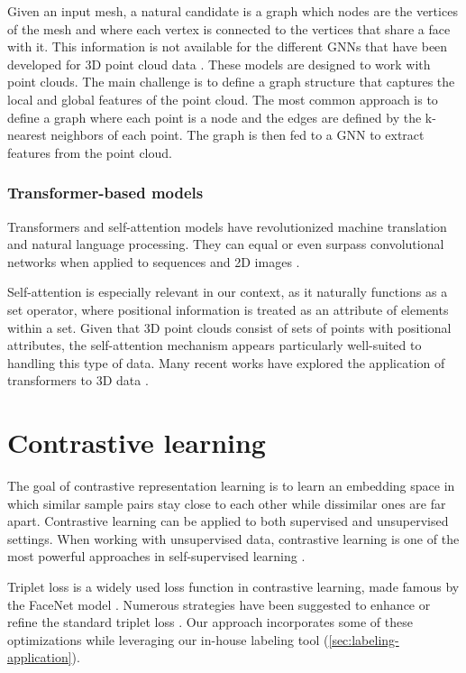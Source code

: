 Given an input mesh, a natural candidate is a graph which nodes are the vertices of the mesh and where each vertex is connected to the vertices that share a face with it. This information is not available for the different GNNs that have been developed for 3D point cloud data \cite{vermaFeaStNetFeatureSteeredGraph2018,wangDynamicGraphCNN2019,dengPPFNetGlobalContext2018}. These models are designed to work with point clouds. The main challenge is to define a graph structure that captures the local and global features of the point cloud. The most common approach is to define a graph where each point is a node and the edges are defined by the k-nearest neighbors of each point. The graph is then fed to a GNN to extract features from the point cloud.

\subsubsection{Transformer-based models}

Transformers \cite{vaswaniAttentionAllYou2023b} and self-attention models have revolutionized machine translation and natural language processing. 
They can equal or even surpass convolutional networks when applied to sequences and 2D images \cite{dosovitskiyImageWorth16x162021}. 

Self-attention is especially relevant in our context, as it naturally functions as a set operator, where positional information is treated as an attribute of elements within a set. Given that 3D point clouds consist of sets of points with positional attributes, the self-attention mechanism appears particularly well-suited to handling this type of data. Many recent works have explored the application of transformers to 3D data \cite{zhaoPointTransformer2021,yuPointBERTPretraining3D2022,liuOpenShapeScaling3D2023}.

\section{Contrastive learning}

The goal of contrastive representation learning is to learn an embedding space in which similar sample pairs stay close to each other while dissimilar ones are far apart. Contrastive learning can be applied to both supervised and unsupervised settings. When working with unsupervised data, contrastive learning is one of the most powerful approaches in self-supervised learning \cite{wengContrastiveRepresentationLearning2021}.


Triplet loss is a widely used loss function in contrastive learning, made famous by the FaceNet model \cite{schroffFaceNetUnifiedEmbedding2015}. Numerous strategies have been suggested to enhance or refine the standard triplet loss \cite{hermansDefenseTripletLoss2017,geDeepMetricLearning2018,sundriyalSemiSupervisedLearningTriplet2021}. Our approach incorporates some of these optimizations while leveraging our in-house labeling tool (\autoref{sec:labeling-application}).

